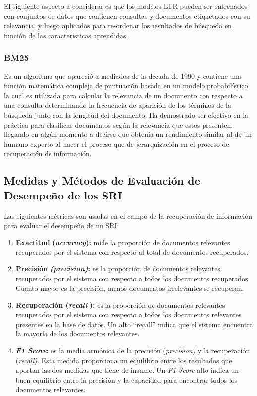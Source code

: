 \documentclass[
  12pt,
  openany]{book}
\begin{document}
El siguiente aspecto a considerar es que los modelos LTR pueden ser entrenados con conjuntos de datos que contienen consultas y documentos etiquetados con su relevancia, y luego aplicados para re-ordenar los resultados de búsqueda en función de las características aprendidas.

\hypertarget{bm25}{%
\subsubsection{BM25}\label{bm25}}

Es un algoritmo que apareció a mediados de la década de 1990 y contiene una función matemática compleja de puntuación basada en un modelo probabilístico \citep{zhai2016} la cual es utilizada para calcular la relevancia de un documento con respecto a una consulta \citep{robertson2009} determinando la frecuencia de aparición de los términos de la búsqueda junto con la longitud del documento. Ha demostrado ser efectivo en la práctica para clasificar documentos según la relevancia que estos presenten, llegando en algún momento a decirse que obtenía un rendimiento similar al de un humano experto al hacer el proceso que de jerarquización en el proceso de recuperación de información.

\hypertarget{evaluacion}{%
\subsection{Medidas y Métodos de Evaluación de Desempeño de los SRI}\label{evaluacion}}

Las siguientes métricas son usadas en el campo de la recuperación de información para evaluar el desempeño de un SRI:

\begin{enumerate}
\def\labelenumi{\arabic{enumi}.}
\item
  \textbf{Exactitud (\emph{accuracy}):} mide la proporción de documentos relevantes recuperados por el sistema con respecto al total de documentos recuperados.
\item
  \textbf{Precisión \emph{(precision)}:} es la proporción de documentos relevantes recuperados por el sistema con respecto a todos los documentos recuperados. Cuanto mayor es la precisión, menos documentos irrelevantes se recuperan.
\item
  \textbf{Recuperación (\emph{recall}} \textbf{):} es la proporción de documentos relevantes recuperados por el sistema con respecto a todos los documentos relevantes presentes en la base de datos. Un alto ``recall'' indica que el sistema encuentra la mayoría de los documentos relevantes.
\item
  \textbf{\emph{F1 Score}:} es la media armónica de la precisión (\emph{precision)} y la recuperación (\emph{recall)}. Esta medida proporciona un equilibrio entre los resultados que aportan las dos medidas que tiene de insumo. Un \emph{F1 Score} alto indica un buen equilibrio entre la precisión y la capacidad para encontrar todos los documentos relevantes.
\end{enumerate}
\end{document}
